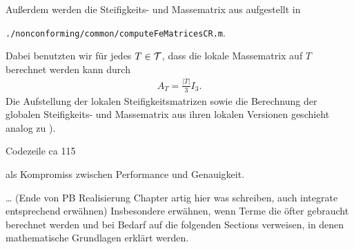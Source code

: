 Außerdem werden die Steifigkeits- und Massematrix aus
 aufgestellt in
\begin{center}
  \texttt{./nonconforming/common/computeFeMatricesCR.m}.
\end{center}
Dabei benutzten wir für jedes $T\in\mathcal{T}$, dass die lokale Massematrix auf
$T$ berechnet werden kann durch
\begin{align*}
  A_T
  =
  \frac{|T|}{3}I_3.
\end{align*}
Die Aufstellung der lokalen Steifigkeitsmatrizen sowie die Berechnung der
globalen Stei\-fig\-keits- und Massematrix aus ihren lokalen Versionen geschieht
analog zu \cite[Abschnitt 1.4.2]{CGKNRR10}).


Codezeile ca 115


als Kompromiss zwischen Performance und Genauigkeit.


\ldots
(Ende von PB Realisierung Chapter artig hier was schreiben, auch integrate
entsprechend erwähnen)
Insbesondere erwähnen, wenn Terme die öfter gebraucht berechnet werden und
bei Bedarf auf die folgenden Sections verweisen, in denen mathematische
Grundlagen erklärt werden.

%
%
%
%
%
%
%
%
%
%


